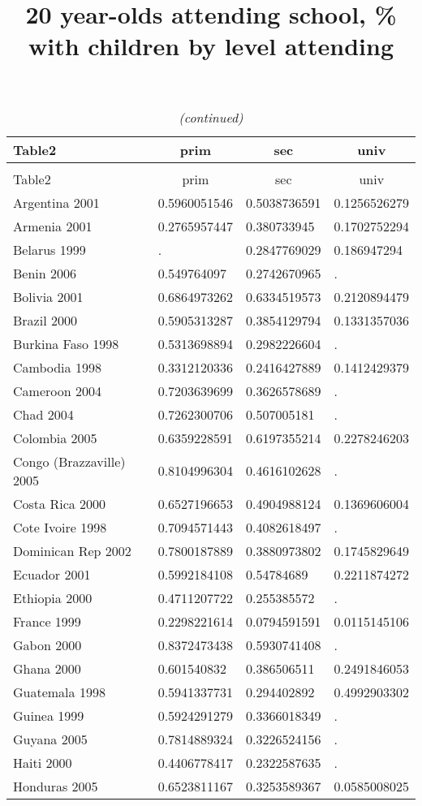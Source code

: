 \documentclass[a4paper]{article}
\begin{document}
\title{20 year-olds attending school, \% with children by level attending}
\maketitle


\pagebreak
%

\setlongtables


\begin{longtable}{llll} \caption{20 year-olds attending school, \% with children by level attending}\tabularnewline
 \hline\hline
\multicolumn{1}{l}{Table2}&\multicolumn{1}{c}{prim}&\multicolumn{1}{c}{sec}&\multicolumn{1}{c}{univ}\tabularnewline
\hline
\endfirsthead
\caption[]{\em (continued)} \tabularnewline
\hline
\multicolumn{1}{l}{Table2}&\multicolumn{1}{c}{prim}&\multicolumn{1}{c}{sec}&\multicolumn{1}{c}{univ}\tabularnewline
\hline
\endhead
\hline
\endfoot
\label{Table2}
Argentina 2001&0.5960051546&0.5038736591&0.1256526279\tabularnewline
Armenia 2001&0.2765957447&0.380733945&0.1702752294\tabularnewline
Belarus 1999&.&0.2847769029&0.186947294\tabularnewline
Benin 2006&0.549764097&0.2742670965&.\tabularnewline
Bolivia 2001&0.6864973262&0.6334519573&0.2120894479\tabularnewline
Brazil 2000&0.5905313287&0.3854129794&0.1331357036\tabularnewline
Burkina Faso 1998&0.5313698894&0.2982226604&.\tabularnewline
Cambodia 1998&0.3312120336&0.2416427889&0.1412429379\tabularnewline
Cameroon 2004&0.7203639699&0.3626578689&.\tabularnewline
Chad 2004&0.7262300706&0.507005181&.\tabularnewline
Colombia 2005&0.6359228591&0.6197355214&0.2278246203\tabularnewline
Congo (Brazzaville) 2005&0.8104996304&0.4616102628&.\tabularnewline
Costa Rica 2000&0.6527196653&0.4904988124&0.1369606004\tabularnewline
Cote Ivoire 1998&0.7094571443&0.4082618497&.\tabularnewline
Dominican Rep 2002&0.7800187889&0.3880973802&0.1745829649\tabularnewline
Ecuador 2001&0.5992184108&0.54784689&0.2211874272\tabularnewline
Ethiopia 2000&0.4711207722&0.255385572&.\tabularnewline
France 1999&0.2298221614&0.0794591591&0.0115145106\tabularnewline
Gabon 2000&0.8372473438&0.5930741408&.\tabularnewline
Ghana 2000&0.601540832&0.386506511&0.2491846053\tabularnewline
Guatemala 1998&0.5941337731&0.294402892&0.4992903302\tabularnewline
Guinea 1999&0.5924291279&0.3366018349&.\tabularnewline
Guyana 2005&0.7814889324&0.3226524156&.\tabularnewline
Haiti 2000&0.4406778417&0.2322587635&.\tabularnewline
Honduras 2005&0.6523811167&0.3253589367&0.0585008025\tabularnewline

\end{longtable}
\end{document}
